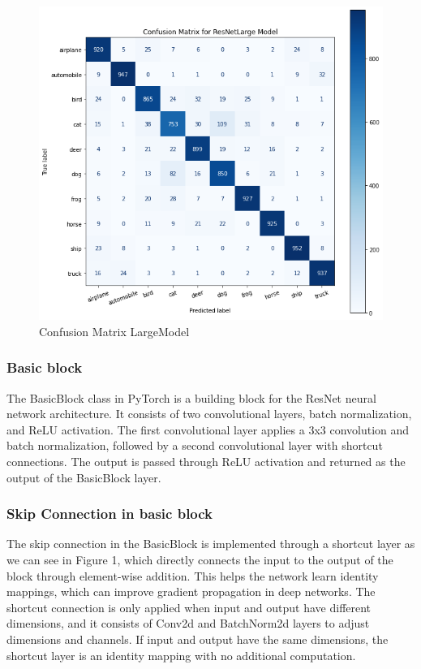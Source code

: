 \documentclass[letterpaper]{article} %
\begin{document}
\begin{figure}[htbp]
\captionsetup[subfigure]{justification=centering}
  \centering
  \includegraphics[scale = 0.4]{image/con_large.png}
  \caption{Confusion Matrix LargeModel}
\end{figure}

\subsubsection{Basic block}
The BasicBlock class in PyTorch is a building block for the ResNet neural network architecture. It consists of two convolutional layers, batch normalization, and ReLU activation. The first convolutional layer applies a 3x3 convolution and batch normalization, followed by a second convolutional layer with shortcut connections. The output is passed through ReLU activation and returned as the output of the BasicBlock layer.
\subsubsection{Skip Connection in basic block}
The skip connection in the BasicBlock is implemented through a shortcut layer as we can see in Figure 1, which directly connects the input to the output of the block through element-wise addition. This helps the network learn identity mappings, which can improve gradient propagation in deep networks. The shortcut connection is only applied when input and output have different dimensions, and it consists of Conv2d and BatchNorm2d layers to adjust dimensions and channels. If input and output have the same dimensions, the shortcut layer is an identity mapping with no additional computation.
\end{document}
